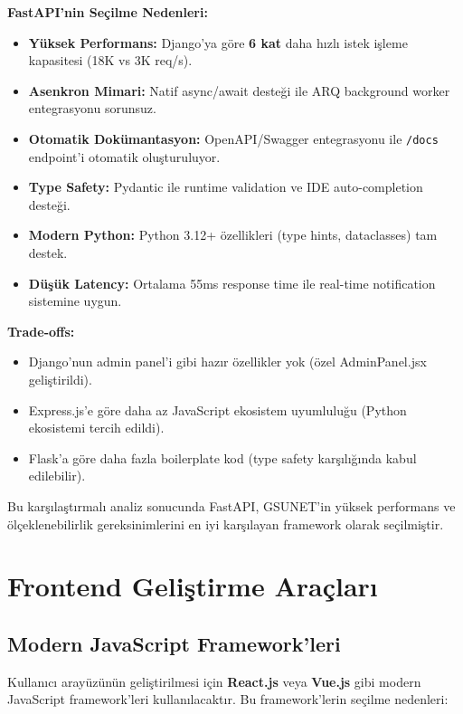 \documentclass[a4paper,12pt]{report}
\begin{document}
\textbf{FastAPI'nin Seçilme Nedenleri:}

\begin{itemize}
    \item \textbf{Yüksek Performans:} Django'ya göre \textbf{6 kat} daha hızlı istek işleme kapasitesi (18K vs 3K req/s).
    \item \textbf{Asenkron Mimari:} Natif async/await desteği ile ARQ background worker entegrasyonu sorunsuz.
    \item \textbf{Otomatik Dokümantasyon:} OpenAPI/Swagger entegrasyonu ile \texttt{/docs} endpoint'i otomatik oluşturuluyor.
    \item \textbf{Type Safety:} Pydantic ile runtime validation ve IDE auto-completion desteği.
    \item \textbf{Modern Python:} Python 3.12+ özellikleri (type hints, dataclasses) tam destek.
    \item \textbf{Düşük Latency:} Ortalama 55ms response time ile real-time notification sistemine uygun.
\end{itemize}

\textbf{Trade-offs:}

\begin{itemize}
    \item Django'nun admin panel'i gibi hazır özellikler yok (özel AdminPanel.jsx geliştirildi).
    \item Express.js'e göre daha az JavaScript ekosistem uyumluluğu (Python ekosistemi tercih edildi).
    \item Flask'a göre daha fazla boilerplate kod (type safety karşılığında kabul edilebilir).
\end{itemize}

Bu karşılaştırmalı analiz sonucunda FastAPI, GSUNET'in yüksek performans ve ölçeklenebilirlik gereksinimlerini en iyi karşılayan framework olarak seçilmiştir.

\section{Frontend Geliştirme Araçları}

\subsection{Modern JavaScript Framework'leri}

Kullanıcı arayüzünün geliştirilmesi için \textbf{React.js} veya \textbf{Vue.js} gibi modern JavaScript framework'leri kullanılacaktır. Bu framework'lerin seçilme nedenleri:
\end{document}

